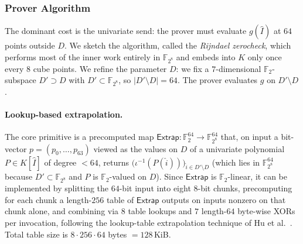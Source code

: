\documentclass{article}
\theoremstyle{definition}
\newcommand{\FF}[1]{\mathbb{F}_{#1}}
\begin{document}
\subsubsection{Prover Algorithm}
\label{sec:rijndael-zerocheck}

The dominant cost is the univariate send: the prover must evaluate $g(\widehat{I})$ at $64$ points outside $D$. We sketch the algorithm, called the \emph{Rijndael zerocheck}, which performs most of the inner work entirely in $\FF{2^8}$ and embeds into $K$ only once every $8$ cube points. We refine the parameter $D$: we fix a $7$-dimensional $\FF{2}$-subspace $D' \supset D$ with $D' \subset \FF{2^8}$, so $|D' \setminus D| = 64$. The prover evaluates $g$ on $D' \setminus D$.

\paragraph{Lookup-based extrapolation.}
The core primitive is a precomputed map $\textsf{Extrap} \colon \FF{2}^{64} \to \FF{2^8}^{64}$ that, on input a bit-vector $p = (p_0, \ldots, p_{63})$ viewed as the values on $D$ of a univariate polynomial $P \in K[\widehat{I}]$ of degree $< 64$, returns $\bigl( \iota^{-1}(P(\widehat{i})) \bigr)_{\widehat{i} \in D' \setminus D}$ (which lies in $\FF{2^8}^{64}$ because $D' \subset \FF{2^8}$ and $P$ is $\FF{2}$-valued on $D$). Since $\textsf{Extrap}$ is $\FF{2}$-linear, it can be implemented by splitting the $64$-bit input into eight $8$-bit chunks, precomputing for each chunk a length-$256$ table of $\textsf{Extrap}$ outputs on inputs nonzero on that chunk alone, and combining via $8$ table lookups and $7$ length-$64$ byte-wise XORs per invocation, following the lookup-table extrapolation technique of Hu et al.~\cite{cryptoeprint:2025/717}. Total table size is $8 \cdot 256 \cdot 64$ bytes $= 128$\,KiB.
\end{document}
